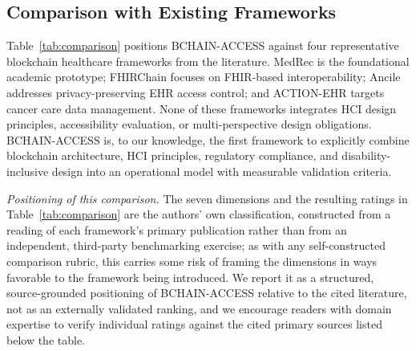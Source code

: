 \documentclass[journal,onecolumn]{IEEEtran}
\begin{document}
\subsection{Comparison with Existing Frameworks}


Table~\ref{tab:comparison} positions BCHAIN-ACCESS against four representative blockchain healthcare frameworks from the literature. MedRec \cite{medrec} is the foundational academic prototype; FHIRChain \cite{zhang2018fhirchain} focuses on FHIR-based interoperability; Ancile \cite{dagher2018ancile} addresses privacy-preserving EHR access control; and ACTION-EHR \cite{dubovitskaya2020action} targets cancer care data management. None of these frameworks integrates HCI design principles, accessibility evaluation, or multi-perspective design obligations. BCHAIN-ACCESS is, to our knowledge, the first framework to explicitly combine blockchain architecture, HCI principles, regulatory compliance, and disability-inclusive design into an operational model with measurable validation criteria.

\emph{Positioning of this comparison.} The seven dimensions and the resulting ratings in Table~\ref{tab:comparison} are the authors' own classification, constructed from a reading of each framework's primary publication rather than from an independent, third-party benchmarking exercise; as with any self-constructed comparison rubric, this carries some risk of framing the dimensions in ways favorable to the framework being introduced. We report it as a structured, source-grounded positioning of BCHAIN-ACCESS relative to the cited literature, not as an externally validated ranking, and we encourage readers with domain expertise to verify individual ratings against the cited primary sources listed below the table.
\end{document}
